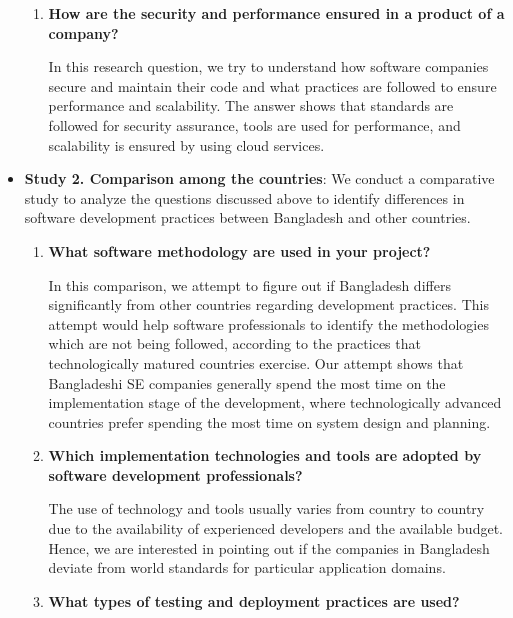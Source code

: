\begin{itemize}[leftmargin=10pt]
\begin{enumerate}[label={\textbf{RQ\arabic{*}.}}, leftmargin=30pt]
    \item \textbf{How are the security and performance ensured in a product of a company?}
        
    In this research question, we try to understand how software companies secure and maintain their code and what practices are followed to ensure performance and scalability. The answer shows that standards are followed for security assurance, tools are used for performance, and scalability is ensured by using cloud services.
        
    \end{enumerate}
    
\item \textbf{Study 2. Comparison among the countries}: We conduct a comparative study to analyze the questions discussed above to identify differences in software development practices between Bangladesh and other countries.

    \begin{enumerate}[label={\textbf{RQ\arabic{*}.}}, leftmargin=30pt, start=5]
    \item \textbf{What software methodology are used in your project?}
    
    In this comparison, we attempt to figure out if Bangladesh differs significantly from other countries regarding development practices. This attempt would help software professionals to identify the methodologies which are not being followed, according to the practices that technologically matured countries exercise. Our attempt shows that Bangladeshi SE companies generally spend the most time on the implementation stage of the development, where technologically advanced countries prefer spending the most time on system design and planning.
    
    \item \textbf{Which implementation technologies and tools are adopted by software development professionals?}
    
    The use of technology and tools usually varies from country to country due to the availability of experienced developers and the available budget. Hence, we are interested in pointing out if the companies in Bangladesh deviate from world standards for particular application domains.
    
    \item \textbf{What types of testing and deployment practices are used?}
    

\end{enumerate}
\end{itemize}
